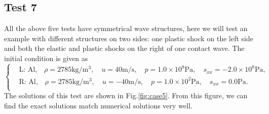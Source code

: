 \documentclass{article}
\numberwithin{equation}{section}
\numberwithin{table}{section}
\begin{document}
\subsection{Test 7}
All the above five tests have symmetrical wave  structures, here we will test an example with different structures on two sides: one plastic shock on the left side and both the elastic and plastic shocks on the right of one contact wave. The initial condition is given as
\begin{equation}
 \left\{ \begin{aligned}
&	 \text{L: Al,}\quad  \rho = 2785 \text{kg}/\text{m}^3, \quad  u = 40\text{m}/\text{s}, \quad  p = 1.0\times 10^8\text{Pa}, \quad  s_{xx}=-2.0\times 10^8 \text{Pa},\\
&	 \text{R: Al,}\quad  \rho = 2785 \text{kg}/\text{m}^3, \quad  u = -40\text{m}/\text{s}, \quad  p = 1.0 \times 10^2 \text{Pa}, \quad  s_{xx}=0.0\text{Pa}.\\
   \end{aligned}
 \right.
\end{equation}
The solutions of this test are shown in Fig.\ref{fig:case5}. From this figure, we can find the exact solutions match numerical solutions very well.
\end{document}
